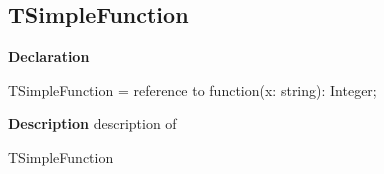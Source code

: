 \documentclass{report}
\newif\ifpdf
\begin{document}
\subsection*{TSimpleFunction}
\fi
\label{ok_anonymous_methods-TSimpleFunction}
\begin{list}{}{
\setlength{\itemindent}{0cm}
\setlength{\listparindent}{0cm}
\setlength{\leftmargin}{\evensidemargin}
\addtolength{\leftmargin}{\tmplength}
\settowidth{\labelsep}{X}
\addtolength{\leftmargin}{\labelsep}
\setlength{\labelwidth}{\tmplength}
}
\item[\textbf{Declaration}\hfill]
\ifpdf
\begin{flushleft}
\fi
\begin{ttfamily}
TSimpleFunction = reference to function(x: string): Integer;\end{ttfamily}

\ifpdf
\end{flushleft}
\fi

\par
\item[\textbf{Description}]
description of \begin{ttfamily}TSimpleFunction\end{ttfamily}

\end{list}
\end{document}
